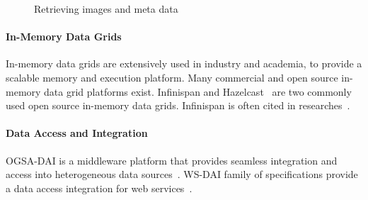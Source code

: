 \documentclass[conference]{IEEEtran}
\begin{document}
\begin{figure}[!h]
	\begin{center}
\vspace{-10pt}

	\end{center}
	\caption{Retrieving images and meta data}
	\label{fig:methods}
\vspace{-15pt}
\end{figure}


\paragraph*{\textbf{In-Memory Data Grids}}
In-memory data grids are extensively used in industry and academia, to provide a scalable memory and execution platform. Many commercial and open source in-memory data grid platforms exist. Infinispan and Hazelcast~\cite{hazelcast} are two commonly used open source in-memory data grids. Infinispan is often cited in researches~\cite{palmieri2012integrated,rosa2011goal,ruivo2011exploiting}.

\paragraph*{\textbf{Data Access and Integration}}
OGSA-DAI is a middleware platform that provides seamless integration and access into heterogeneous data sources~\cite{antonioletti2005design}. WS-DAI family of specifications provide a data access integration for web services~\cite{antonioletti2006ws}.
\end{document}
